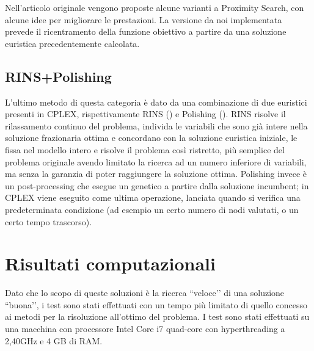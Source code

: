 Nell'articolo originale vengono proposte alcune varianti a Proximity Search, con alcune idee per migliorare le prestazioni. La versione da noi implementata prevede il ricentramento della funzione obiettivo a partire da una soluzione euristica precedentemente calcolata.

\subsection{RINS+Polishing}\label{sec:rins}
L’ultimo metodo di questa categoria è dato da una combinazione di due euristici presenti in CPLEX, rispettivamente RINS (\citet*{danna2005exploring}) e Polishing (\citet*{rothberg2007evolutionary}). RINS risolve il rilassamento continuo del problema, individa le variabili che sono già intere nella soluzione frazionaria ottima e concordano con la soluzione euristica iniziale, le fissa nel modello intero e risolve il problema così ristretto, più semplice del problema originale avendo limitato la ricerca ad un numero inferiore di variabili, ma senza la garanzia di poter raggiungere la soluzione ottima. Polishing invece è un post-processing che esegue un genetico a partire dalla soluzione incumbent; in CPLEX viene eseguito come ultima operazione, lanciata quando si verifica una predeterminata condizione (ad esempio un certo numero di nodi valutati, o un certo tempo trascorso).

\section{Risultati computazionali}
Dato che lo scopo di queste soluzioni è la ricerca ``veloce’’ di una soluzione ``buona’’, i test sono stati effettuati con un tempo più limitato di quello concesso ai metodi per la risoluzione all’ottimo del problema. I test sono stati effettuati su una macchina con processore Intel Core i7 quad-core con hyperthreading a 2,40GHz e 4 GB di RAM.

